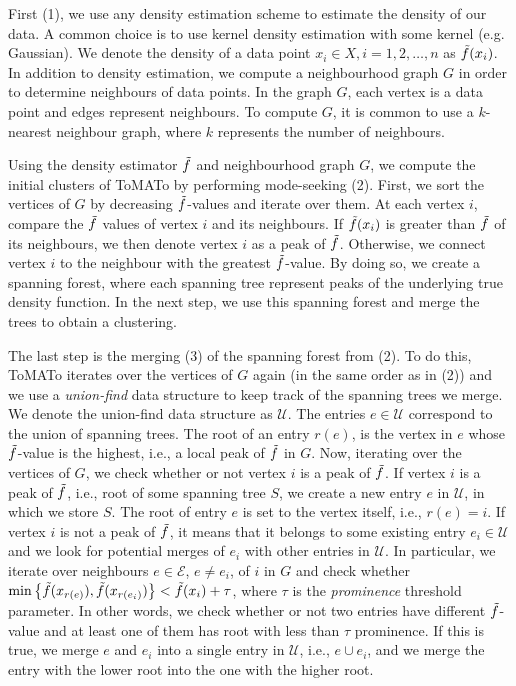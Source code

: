First (1), we use any density estimation scheme to estimate the density of our data. A common choice is to use kernel density estimation with some kernel (e.g. Gaussian). We denote the density of a data point $x_i \in X, i = 1, 2, \ldots, n$ as $\Tilde{f}(x_i)$. In addition to density estimation, we compute a neighbourhood graph $G$ in order to determine neighbours of data points. In the graph $G$, each vertex is a data point and edges represent neighbours. To compute $G$, it is common to use a $k$-nearest neighbour graph, where $k$ represents the number of neighbours.

Using the density estimator $\Tilde{f}$ and neighbourhood graph $G$, we compute the initial clusters of ToMATo by performing mode-seeking (2). First, we sort the vertices of $G$ by decreasing $\Tilde{f}$-values and iterate over them. At each vertex $i$, compare the $\Tilde{f}$ values of vertex $i$ and its neighbours. If $\Tilde{f}(x_i)$ is greater than $\Tilde{f}$ of its neighbours, we then denote vertex $i$ as a peak of $\Tilde{f}$. Otherwise, we connect vertex $i$ to the neighbour with the greatest $\Tilde{f}$-value. By doing so, we create a spanning forest, where each spanning tree represent peaks of the underlying true density function. In the next step, we use this spanning forest and merge the trees to obtain a clustering.

The last step is the merging (3) of the spanning forest from (2). To do this, ToMATo iterates over the vertices of $G$ again (in the same order as in (2)) and we use a \textit{union-find} data structure to keep track of the spanning trees we merge. We denote the union-find data structure as $\mathcal{U}$. The entries $e \in \mathcal{U}$ correspond to the union of spanning trees. The root of an entry $r(e)$, is the vertex in $e$ whose $\Tilde{f}$-value is the highest, i.e., a local peak of $\Tilde{f}$ in $G$. Now, iterating over the vertices of $G$, we check whether or not vertex $i$ is a peak of $\Tilde{f}$. If vertex $i$ is a peak of $\Tilde{f}$, i.e., root of some spanning tree $S$, we create a new entry $e$ in $\mathcal{U}$, in which we store $S$. The root of entry $e$ is set to the vertex itself, i.e., $r(e) = i$. If vertex $i$ is not a peak of $\Tilde{f}$, it means that it belongs to some existing entry $e_i \in \mathcal{U}$ and we look for potential merges of $e_i$ with other entries in $\mathcal{U}$. In particular, we iterate over neighbours $e \in \mathcal{E}$, $e \neq e_i$, of $i$ in $G$ and check whether $\min \left\{ \Tilde{f}(x_{r(e)}), \Tilde{f}(x_{r(e_i)}) \right\} < \Tilde{f}(x_i) + \tau$, where $\tau$ is the \textit{prominence} threshold parameter. In other words, we check whether or not two entries have different $\Tilde{f}$-value and at least one of them has root with less than $\tau$ prominence. If this is true, we merge $e$ and $e_i$ into a single entry in $\mathcal{U}$, i.e., $e \cup e_i$, and we merge the entry with the lower root into the one with the higher root.

